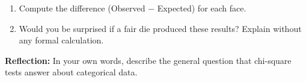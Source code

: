 \documentclass[10pt]{article}
\begin{document}
\begin{enumerate}
        \begin{enumerate}[label=\alph*.]
          \item Compute the difference (Observed $-$ Expected) for each face.

          \item Would you be surprised if a fair die produced these results?
                Explain without any formal calculation.
        \end{enumerate}

\end{enumerate}

\begin{reflectionbox}
\textbf{Reflection:} In your own words, describe the general question that chi-square
tests answer about categorical data.

\end{reflectionbox}
\end{document}
